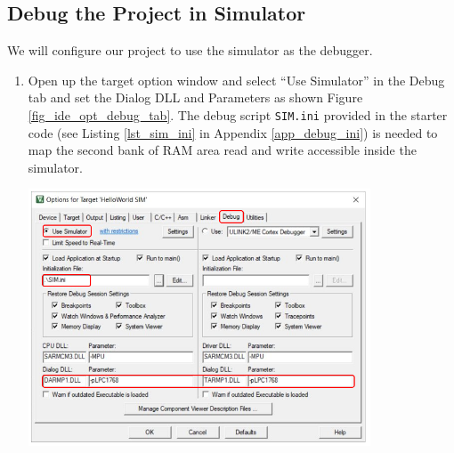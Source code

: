 
  \subsection{Debug the Project in Simulator}
    We will configure our project to use the simulator as the debugger.
    \begin{enumerate}
    \item Open up the target option window and select ``Use Simulator'' in the Debug tab and set the Dialog DLL and Parameters as shown Figure \ref{fig_ide_opt_debug_tab}.
    The debug script \verb+SIM.ini+ provided in the starter code (see Listing \ref{lst_sim_ini} in
    Appendix \ref{app_debug_ini}) is needed to map the second bank of RAM area read and write
    accessible inside the simulator. \par
          \begin{minipage}{\linewidth}
            \centering
            \includegraphics[width=4in]{figure/uv5/IDE_opt_debug_tab}
            \label{fig_ide_opt_debug_tab}
          \end{minipage}


\end{enumerate}
